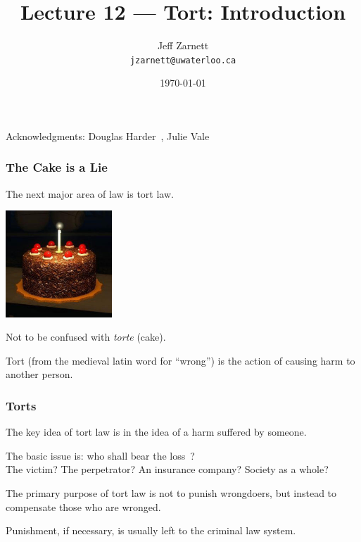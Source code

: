 

\title{Lecture 12 --- Tort: Introduction }

\author{Jeff Zarnett \\ \small \texttt{jzarnett@uwaterloo.ca}}
\date{\today}




\begin{frame}
  \titlepage

\begin{center}
  \small{Acknowledgments: Douglas Harder~\cite{dwh}, Julie Vale~\cite{jv}}
  \end{center}
\end{frame}




\begin{frame}
\frametitle{The Cake is a Lie}

The next major area of law is \alert{tort} law.

\begin{center}
	\includegraphics[width=0.3\textwidth]{images/portal-cake.jpg}
\end{center}

Not to be confused with \textit{torte} (cake).

Tort (from the medieval latin word for ``wrong'') is the action of causing harm to another person.


\end{frame}



\begin{frame}
\frametitle{Torts}

The key idea of tort law is in the idea of a harm suffered by someone. 

The basic issue is: who shall bear the loss~\cite{lba}?\\
\quad The victim? The perpetrator? An insurance company? Society as a whole?

The primary purpose of tort law is not to punish wrongdoers, but instead to compensate those who are wronged.

Punishment, if necessary, is usually left to the criminal law system.

\end{frame}



